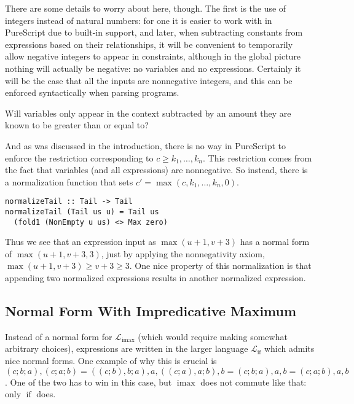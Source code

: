\documentclass[11pt, twoside, reqno]{book}
\DeclareMathOperator{\imax}{imax}
\DeclareMathOperator{\ifop}{if}
\begin{document}
There are some details to worry about here, though.
The first is the use of integers instead of natural numbers:
for one it is easier to work with in PureScript due to built-in support,
and later, when subtracting constants from expressions based on their relationships,
it will be convenient to temporarily allow negative integers to appear in constraints, although in the global picture nothing will actually be negative: no variables and no expressions.
Certainly it will be the case that all the inputs are nonnegative integers, and this can be enforced syntactically when parsing programs.

\begin{mdframed}[style=TODO]
Will variables only appear in the context subtracted by an amount they are known to be greater than or equal to?
\end{mdframed}

And as was discussed in the introduction, there is no way in PureScript to enforce the restriction corresponding to \(c \ge k_1, \dots, k_n\).
This restriction comes from the fact that variables (and all expressions) are nonnegative.
So instead, there is a normalization function that sets \(c\prime = \max(c, k_1, \dots, k_n, 0)\).
\begin{verbatim}
normalizeTail :: Tail -> Tail
normalizeTail (Tail us u) = Tail us
  (fold1 (NonEmpty u us) <> Max zero)
\end{verbatim}
Thus we see that an expression input as \(\max(u+1, v+3)\) has a normal form of \(\max(u+1, v+3, 3)\), just by applying the nonnegativity axiom, \(\max(u+1, v+3) \ge v+3 \ge 3\).
One nice property of this normalization is that appending two normalized expressions results in another normalized expression.

\subsection{Normal Form With Impredicative Maximum}

Instead of a normal form for \(\mathcal{L}_{\imax}\) (which would require making somewhat arbitrary choices), expressions are written in the larger language \(\mathcal{L}_{\ifop}\) which admits nice normal forms.
One example of why this is crucial is \((c; b; a), (c; a; b) = ((c; b), b; a), a, ((c; a), a; b), b = (c; b; a), a, b = (c; a; b), a, b\).
One of the two has to win in this case, but \(\imax\) does not commute like that: only \(\ifop\) does.
\end{document}
